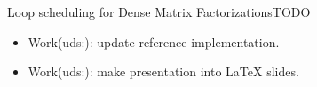 
\begin{frame}{Loop scheduling for Dense Matrix Factorizations}{TODO} 
\begin{itemize} 
\item Work(uds:): update reference implementation. 
\item Work(uds:): make presentation into LaTeX slides. 
\end{itemize}
\end{frame}


